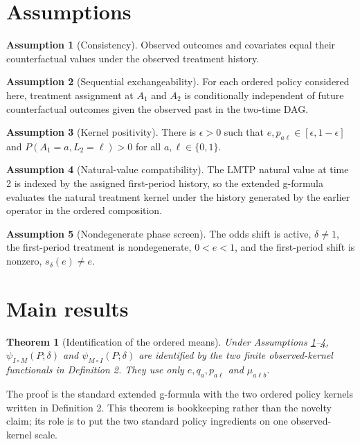 \documentclass[11pt]{article}
\theoremstyle{definition}
\newtheorem{assumption}{Assumption}
\theoremstyle{plain}
\newtheorem{theorem}{Theorem}
\theoremstyle{remark}
\begin{document}
\section{Assumptions}
\begin{assumption}[Consistency]\label{ass:consistency}
Observed outcomes and covariates equal their counterfactual values under the observed treatment history.
\end{assumption}

\begin{assumption}[Sequential exchangeability]\label{ass:seqex}
For each ordered policy considered here, treatment assignment at $A_1$ and $A_2$ is conditionally independent of future counterfactual outcomes given the observed past in the two-time DAG.
\end{assumption}

\begin{assumption}[Kernel positivity]\label{ass:positivity}
There is $\epsilon>0$ such that $e,p_{a\ell}\in[\epsilon,1-\epsilon]$ and $P(A_1=a,L_2=\ell)>0$ for all $a,\ell\in\{0,1\}$.
\end{assumption}

\begin{assumption}[Natural-value compatibility]\label{ass:naturalcompat}
The LMTP natural value at time 2 is indexed by the assigned first-period history, so the extended g-formula evaluates the natural treatment kernel under the history generated by the earlier operator in the ordered composition.
\end{assumption}

\begin{assumption}[Nondegenerate phase screen]\label{ass:nondegenerate}
The odds shift is active, $\delta\ne1$, the first-period treatment is nondegenerate, $0<e<1$, and the first-period shift is nonzero, $s_\delta(e)\ne e$.
\end{assumption}

\section{Main results}
\begin{theorem}[Identification of the ordered means]\label{thm:identified}
Under Assumptions \ref{ass:consistency}--\ref{ass:naturalcompat}, $\psi_{I\circ M}(P;\delta)$ and $\psi_{M\circ I}(P;\delta)$ are identified by the two finite observed-kernel functionals in Definition 2. They use only $e,q_a,p_{a\ell}$ and $\mu_{a\ell b}$.
\end{theorem}
The proof is the standard extended g-formula with the two ordered policy kernels written in Definition 2. This theorem is bookkeeping rather than the novelty claim; its role is to put the two standard policy ingredients on one observed-kernel scale.
\end{document}
